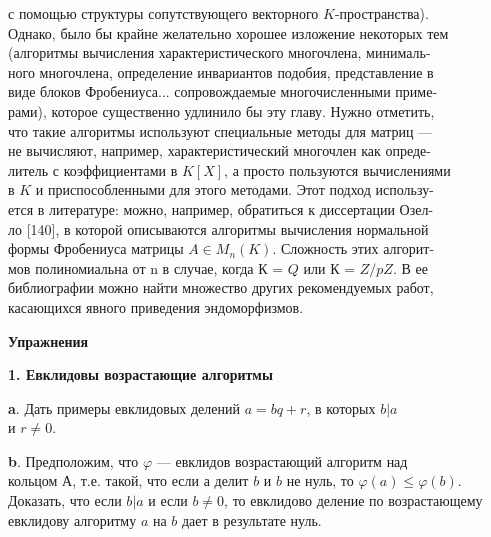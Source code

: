 \documentclass{../template/mai_book}
\begin{document}
\noindent с помощью структуры сопутствующего векторного $K$-пространства).\\ 
Однако, было бы крайне желательно хорошее изложение некоторых тем\\ 
(алгоритмы вычисления характеристического многочлена, 
минималь-\\ного многочлена, определение инвариантов подобия, представление в\\ виде блоков Фробениуса... сопровождаемые многочисленными 
приме-\\рами), которое существенно удлинило бы эту главу. Нужно отметить,\\ 
что такие алгоритмы используют специальные методы для матриц —\\ 
не вычисляют, например, характеристический многочлен как 
опреде-\\литель с коэффициентами в $K[X]$, а просто пользуются вычислениями\\ 
в $K$ и приспособленными для этого методами. Этот подход 
использу-\\ется в литературе: можно, например, обратиться к диссертации Озел-\\ ло [140], в которой описываются алгоритмы вычисления нормальной\\ 
формы Фробениуса матрицы $A \in M_n(K)$. Сложность этих 
алгорит-\\мов полиномиальна от n в случае, когда $К$ = $Q$ или $К$ = $Z/pZ$. В ее \\
библиографии можно найти множество других рекомендуемых работ,\\ 
касающихся явного приведения эндоморфизмов.

\pagebreak

\cleartop
\rule{0pt}{10pt}

\begin{center}

{\large\bf Упражнения}
\end{center}

\rule{0pt}{10pt}

{\noindent \bf 1. Евклидовы возрастающие алгоритмы} 

\medskip

{\bf a}. Дать примеры евклидовых делений $a = bq + r$, в которых $b | a$ \\
и $r\ne 0$. 

\medskip

{\bf b}. Предположим, что $\varphi$ — евклидов возрастающий алгоритм над\\ 
кольцом А, т.е. такой, что если а делит $b$ и $b$ не нуль, то $\varphi(a)  \leqslant \varphi(b)$. 
Доказать, что если $b | a$ и если $b\ne 0$, то евклидово деление по 
возрастающему евклидову алгоритму $a$ на $b$ дает в результате нуль. 
\end{document}
